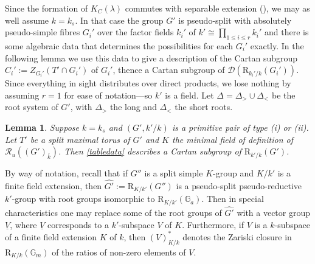 \documentclass[11pt,reqno]{amsart}
\newtheorem{lemma}{Lemma}[subsection]
\theoremstyle{definition}
\theoremstyle{remark}
\theoremstyle{definition}
\theoremstyle{plain}
\newcommand{\R}{\mathrm{R}}
\newcommand{\RR}{\mathscr{R}}
\newcommand{\G}{\mathscr{G}}
\newcommand{\D}{\mathscr{D}}
\newcommand{\Gm}{\mathbb{G}_m}
\newcommand{\Ga}{\mathbb{G}_a}
\renewcommand{\D}{\mathscr{D}}
\newcommand{\bark}{{\overline{k}}}
\begin{document}

Since the formation of $K_C(\lambda)$ commutes with separable extension (), we may as well assume $k=k_s$. In that case the group $G'$ is pseudo-split with absolutely pseudo-simple fibres $G_i'$ over the factor fields $k_i'$ of $k'\cong \prod_{1\leq i\leq r}k_i'$ and there is some algebraic data that determines the possibilities for each $G_i'$ exactly. In the following lemma we use this data to give a description of the Cartan subgroup $C_i':=Z_{G_i'}(T'\cap G_i')$ of $G_i'$, thence a Cartan subgroup of $\D(\R_{k_i'/k}(G_i'))$. Since everything in sight distributes over direct products, we lose nothing by assuming $r=1$ for ease of notation---so $k'$ is a field. Let $\Delta=\Delta_>\cup \Delta_<$ be the root system of $G'$, with $\Delta_>$ the long and $\Delta_<$ the short roots.
\begin{lemma}
  Suppose $k=k_s$ and $(G',k'/k)$ is a primitive pair of type (i) or (ii). Let $T'$ be a split maximal torus of $G'$ and $K$ the minimal field of definition of $\RR_u((G')_\bark)$. Then \cref{tabledata} describes a Cartan subgroup of $\R_{k'/k}(G')$.
\end{lemma}

By way of notation, recall that if $G''$ is a split simple $K$-group and $K/k'$ is a finite field extension, then $\widehat{G'}:=\R_{K/k'}(G'')$ is a pseudo-split pseudo-reductive $k'$-group with root groups isomorphic to $\R_{K/k'}(\Ga)$. Then in special characteristics one may replace some of the root groups of $\widehat{G'}$ with a vector group $\underline{V}$, where $\underline V$ corresponds to a $k'$-subspace $V$ of $K$. Furthermore, if $V$ is a $k$-subspace of a finite field extension $K$ of $k$, then $(V)^*_{K/k}$ denotes the Zariski closure in $\R_{K/k}(\Gm)$ of the ratios of non-zero elements of $V$. 
\end{document}
